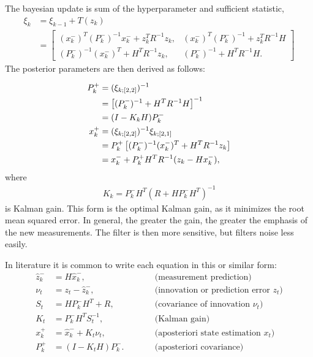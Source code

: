 The bayesian update is sum of the hyperparameter and sufficient statistic,
\begin{align}
    \xi_{k}
    &= \xi_{k-1} +  T(z_{k})  \nonumber \\
    &=
    \begin{bmatrix}
    (x_{k}^{-})^{T} (P_{k}^{-})^{-1} x_{k}^{-} + z_{k}^{T} R^{-1} z_{k},
    & (x_{k}^{-})^{T} (P_{k}^{-})^{-1} + z_{k}^{T} R^{-1} H \\
    (P_{k}^{-})^{-1} (x_{k}^{-})^{T} + H^{T} R^{-1} z_{k},
    & (P_{k}^{-})^{-1} + H^{T} R^{-1} H.
    \end{bmatrix}
\end{align}
The posterior parameters are then derived as follows:

\begin{align}
    P_{k}^{+} &= (\xi_{k;[2,2]})^{-1} \notag\\
    &= \left[ (P_{k}^{-})^{-1} + H^{T} R^{-1} H \right]^{-1} \notag\\
    &= (I - K_{k} H) P_{k}^{-} \\
    x_{k}^{+} &= (\xi_{k;[2,2]})^{-1} \xi_{k;[2,1]} \notag\\
    &= P_{k}^{+} \left[ (P_{k}^{-})^{-1} (x_{k}^{-})^{T} + H^{T} R^{-1} z_{k}\right] \notag \\
    &= x_{k}^{-} + P_{k}^{+} H^{T} R^{-1}(z_{k} - Hx_{k}^{-}),
\end{align}
where
\begin{align}
    K_{k} = P_{k}^{-} H^{T}(R + H P_{k}^{-}H^{T})^{-1}
\end{align}
is Kalman gain. This form is the optimal Kalman gain, as it minimizes the root mean squared error. In general, the greater the gain, the greater the emphasis of the new measurements. The filter is then more sensitive, but filters noise less easily.

In literature it is common to write each equation in this or similar form:
\begin{align}
    \hat{z}_{k}^{-} &= H \hat{x}_{k}^{-}, \qquad &&\text{(measurement prediction)} \\
    \nu_t &= z_t - \hat{z}_{k}^{-}, \qquad &&\text{(innovation or prediction error $z_t$)} \\
    S_t &= H P_{k}^{-} H^T + R, \qquad &&\text{(covariance of innovation $\nu_t$)} \\
    K_t &= P_{k}^{-} H^T S_t^{-1}, \qquad &&\text{(Kalman gain)} \\
    {x}_{k}^{+} &= \hat{x}_{k}^{-} + K_t \nu_t, \qquad &&\text{(aposteriori state estimation $x_t$)} \\
    P_{k}^{+} &= (I - K_t H) P_{k}^{-}. \qquad &&\text{(aposteriori covariance)}
\end{align}

